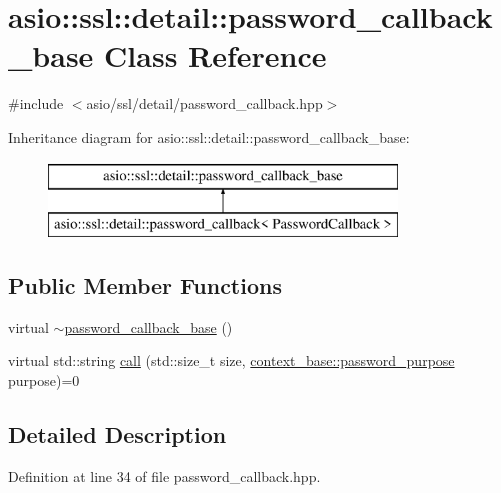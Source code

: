 \hypertarget{classasio_1_1ssl_1_1detail_1_1password__callback__base}{}\section{asio\+:\+:ssl\+:\+:detail\+:\+:password\+\_\+callback\+\_\+base Class Reference}
\label{classasio_1_1ssl_1_1detail_1_1password__callback__base}


{\ttfamily \#include $<$asio/ssl/detail/password\+\_\+callback.\+hpp$>$}

Inheritance diagram for asio\+:\+:ssl\+:\+:detail\+:\+:password\+\_\+callback\+\_\+base\+:\begin{figure}[H]
\begin{center}
\leavevmode
\includegraphics[height=2.000000cm]{classasio_1_1ssl_1_1detail_1_1password__callback__base}
\end{center}
\end{figure}
\subsection*{Public Member Functions}
\begin{DoxyCompactItemize}
\item 
virtual \hyperlink{classasio_1_1ssl_1_1detail_1_1password__callback__base_afa48903d65b20b6a1b5a6349dfad9b62}{$\sim$password\+\_\+callback\+\_\+base} ()
\item 
virtual std\+::string \hyperlink{classasio_1_1ssl_1_1detail_1_1password__callback__base_a0921e1cba762d2b75cd198ed2bac110a}{call} (std\+::size\+\_\+t size, \hyperlink{classasio_1_1ssl_1_1context__base_a0e5aec1cd0f3db28becde1dca686c855}{context\+\_\+base\+::password\+\_\+purpose} purpose)=0
\end{DoxyCompactItemize}


\subsection{Detailed Description}


Definition at line 34 of file password\+\_\+callback.\+hpp.




